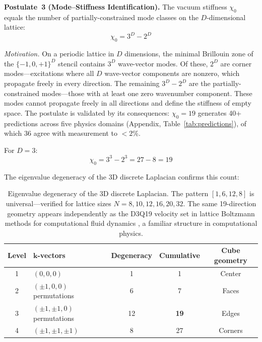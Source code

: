 \documentclass[12pt,a4paper]{article}
\newcommand{\chizero}{\chi_0}
\begin{document}
\textbf{Postulate~3 (Mode--Stiffness Identification).} The vacuum stiffness $\chizero$ equals the number of partially-constrained mode classes on the $D$-dimensional lattice:
\begin{equation}
\chizero = 3^D - 2^D
\end{equation}

\textit{Motivation.} On a periodic lattice in $D$ dimensions, the minimal Brillouin zone of the $\{-1,0,+1\}^D$ stencil contains $3^D$ wave-vector modes. Of these, $2^D$ are corner modes---excitations where all $D$ wave-vector components are nonzero, which propagate freely in every direction. The remaining $3^D - 2^D$ are the partially-constrained modes---those with at least one zero wavenumber component. These modes cannot propagate freely in all directions and define the stiffness of empty space. The postulate is validated by its consequences: $\chizero = 19$ generates 40+ predictions across five physics domains (Appendix, Table~\ref{tab:predictions}), of which 36 agree with measurement to $< 2$\%.

For $D = 3$:
\begin{equation}\label{eq:chi19}
\boxed{\chizero = 3^3 - 2^3 = 27 - 8 = 19}
\end{equation}

The eigenvalue degeneracy of the 3D discrete Laplacian confirms this count:

\begin{table}[h]
\centering
\begin{tabular}{clccc}
\toprule
Level & $\mathbf{k}$-vectors & Degeneracy & Cumulative & Cube geometry \\
\midrule
1 & $(0,0,0)$ & 1 & 1 & Center \\
2 & $(\pm1,0,0)$ permutations & 6 & 7 & Faces \\
3 & $(\pm1,\pm1,0)$ permutations & 12 & \textbf{19} & Edges \\
4 & $(\pm1,\pm1,\pm1)$ & 8 & 27 & Corners \\
\bottomrule
\end{tabular}
\caption{Eigenvalue degeneracy of the 3D discrete Laplacian. The pattern $[1, 6, 12, 8]$ is universal---verified for lattice sizes $N = 8, 10, 12, 16, 20, 32$. The same 19-direction geometry appears independently as the D3Q19 velocity set in lattice Boltzmann methods for computational fluid dynamics \citep{Succi2018}, a familiar structure in computational physics.}
\label{tab:modes}
\end{table}
\end{document}
